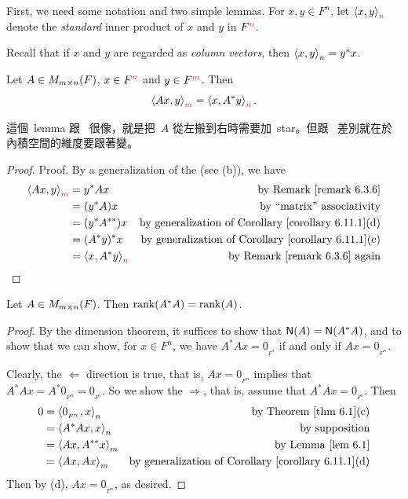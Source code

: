 First, we need some notation and two simple lemmas.
For \(x, y \in F^n\), let \(\LG x, y \RG_{\RED{n}}\) denote the \emph{standard} inner product of \(x\) and \(y\) in \(F^{\RED{n}}\).

\begin{remark} \label{remark 6.3.6}
Recall that if \(x\) and \(y\) are regarded as \emph{column vectors}, then \(\left< x, y \right>_n = y^*x\).
\end{remark}

\begin{lemma} \label{lem 6.1}
Let \(A \in M_{m \times n}(F)\), \(x \in F^{\MAROON{n}}\) and \(y \in F^{\RED{m}}\).
Then
\[
    \LG Ax, y \RG_{\RED{m}} = \LG x, A^*y \RG_{\MAROON{n}}.
\]
\end{lemma}

\begin{note}
這個\ lemma 跟\  很像，就是把\ \(A\) 從左搬到右時需要加\ star。但跟\  差別就在於內積空間的維度要跟著變。
\end{note}

\begin{proof}
Proof. By a generalization of the (see (b)), we have
\begin{align*}
    \LG Ax, y \RG_{\RED{m}} & = y^* Ax & \text{by \RMK{6.3.6}} \\
        & = (y^* A) x & \text{by ``matrix'' associativity} \\
        & = (y^* A^{**}) x & \text{by generalization of \CORO{6.11.1}(d)} \\
        & = (A^* y)^* x & \text{by generalization of \CORO{6.11.1}(c)} \\
        & = \LG x, A^* y \RG_{\MAROON{n}} & \text{by \RMK{6.3.6} again}
\end{align*}
\end{proof}

\begin{lemma} \label{lem 6.2}
Let \(A \in M_{m \times n}(F)\).
Then \(\mathrm{rank}(A^* A) = \mathrm{rank}(A)\).
\end{lemma}

\begin{proof}
By the dimension theorem, it suffices to show that \(\textsf{N}(A) = \textsf{N}(A^* A)\), and to show that we can show, for \(x \in F^n\), we have \(A^* Ax = 0_{_{F^n}}\) if and only if \(Ax = 0_{_{F^m}}\).

Clearly, the \(\Longleftarrow\) direction is true, that is, \(Ax = 0_{_{F^m}}\) implies that \(A^* Ax = A^* 0_{_{F^m}} = 0_{_{F^n}}\).
So we show the \(\Longrightarrow\), that is, assume that \(A^* A x = 0_{_{F^n}}\).
Then
\begin{align*}
    0 & = \LG 0_{_{F^n}}, x \RG_n & \text{by \THM{6.1}(c)} \\
      & = \LG A^* A x, x \RG_n & \text{by supposition} \\
      & = \LG A x, A^{**} x \RG_m & \text{by \LEM{6.1}} \\
      & = \LG A x, A x \RG_m & \text{by generalization of \CORO{6.11.1}(d)}
\end{align*}
Then by (d), \(Ax = 0_{_{F^m}}\), as desired.
\end{proof}

